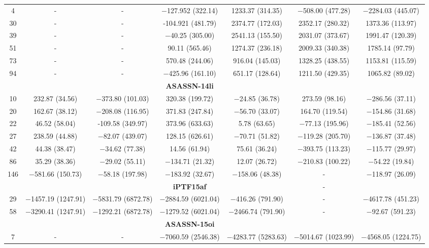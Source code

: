 \documentclass[structabstract]{aa}
\begin{document}
\begin{small}
\begin{longtable}{c c c c c c c}
4	&	-	&	-	&	$-$127.952 (322.14)	&	1233.37 (314.35)	&	$-$508.00 (477.28)	&	$-$2284.03 (445.07)  \\
30	&	-	&	-	&	-104.921 (481.79)	&	2374.77 (172.03)	&	2352.17 (280.32)	&	1373.36 (113.97)  \\
39	&	-	&	-	&	$-$40.25 (305.00)	&	2541.13 (155.50)	&	2031.07 (373.67)	&	1991.47 (120.39)  \\
51	&	-	&	-	&	90.11 (565.46)	&	1274.37 (236.18)	&	2009.33 (340.38)	&	1785.14 (97.79)  \\
73	&	-	&	-	&	570.48 (244.06)	&	916.04 (145.03)	&	1328.25 (438.55)	&	1153.81 (115.59)  \\
94	&	-	&	-	&	$-$425.96 (161.10)	&	651.17 (128.64)	&	1211.50 (429.35)	&	1065.82 (89.02)  \\ \hline
	&		&		&	\textbf{ASASSN-14li}	&		&		&	\\ \hline
10	&	232.87 (34.56)	&	$-$373.80 (101.03)	&	320.38 (199.72)	&	$-$24.85 (36.78)	&	273.59 (98.16)	&	$-$286.56 (37.11)  \\
20	&	162.67 (38.12)	&	$-$208.08 (116.95)	&	371.83 (247.84)	&	$-$56.70 (33.07)	&	164.70 (119.54)	&	$-$154.86 (31.68)  \\
22	&	46.52 (58.04)	&	-109.58 (349.97)	&	373.96 (633.63)	&	5.78 (63.65)	&	$-$77.13 (195.96)	&	$-$185.41 (52.56)  \\
27	&	238.59 (44.88)	&	$-$82.07 (439.07)	&	128.15 (626.61)	&	$-$70.71 (51.82)	&	$-$119.28 (205.70)	&	$-$136.87 (37.48)  \\
42	&	44.38 (38.47)	&	$-$34.62 (77.38)	&	14.56 (61.94)	&	75.61 (36.24)	&	$-$393.75 (113.23)	&	$-$115.77 (29.97)  \\
86	&	35.29 (38.36)	&	$-$29.02 (55.11)	&	$-$134.71 (21.32)	&	12.07 (26.72)	&	$-$210.83 (100.22)	&	$-$54.22 (19.84)  \\
146	&	$-$581.66 (150.73)	&	$-$58.18 (197.98)	&	$-$183.92 (32.67)	&	$-$158.06 (48.38)	&	-	&	$-$118.97 (26.09)  \\ \hline
	&		&		&	\textbf{iPTF15af}	&		&	-	&	\\ \hline
29	&	$-$1457.19 (1247.91)	&	$-$5831.79 (6872.78)	&	$-$2884.59 (6021.04)	&	$-$416.26 (791.90)	&	-	&	$-$4617.78 (451.23)  \\
58	&	$-$3290.41 (1247.91)	&	$-$1292.21 (6872.78)	&	$-$1279.52 (6021.04)	&	$-$2466.74 (791.90)	&	-	&	$-$92.67 (591.23)  \\ \hline
	&		&		&	\textbf{ASASSN-15oi}	&		&		&	\\ \hline
7	&	-	&	-	&	$-$7060.59 (2546.38)	&	$-$4283.77 (5283.63)	&	$-$5014.67 (1023.99)	&	$-$4568.05 (1224.75)  \\

\end{longtable}
\end{small}
\end{document}
